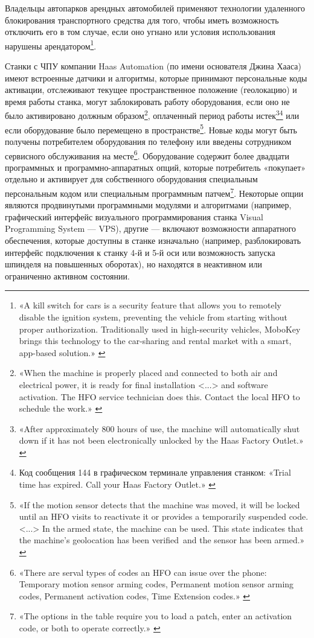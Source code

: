 \documentclass{article}
\begin{document}
Владельцы автопарков арендных автомобилей применяют технологии удаленного блокирования транспортного средства для того, чтобы иметь возможность отключить его в том случае, если оно угнано или условия использования нарушены арендатором\footnote{«A kill switch for cars is a security feature that allows you to remotely disable the ignition system, preventing the vehicle from starting without proper authorization. Traditionally used in high-security vehicles, MoboKey brings this technology to the car-sharing and rental market with a smart, app-based solution.» \cite{mobokeyCarRental2025}}.

Станки с ЧПУ компании Haas Automation (по имени основателя Джина Хааса) имеют встроенные датчики и алгоритмы, которые принимают персональные коды активации, отслеживают текущее пространственное положение (геолокацию) и время работы станка, могут заблокировать работу оборудования, если оно не было активировано должным образом\footnote{«When the machine is properly placed and connected to both air and electrical power, it is ready for final installation <...> and software activation. The HFO service technician does this. Contact the local HFO to schedule the work.» \cite{haascncLatheInstallation}}, оплаченный период работы истек\footnote{«After approximately 800 hours of use, the machine will automatically shut down if it has not been electronically unlocked by the Haas Factory Outlet.» \cite{haascncOperatorManual}}\footnote{Код сообщения 144 в графическом терминале управления станком: «Trial time has expired. Call your Haas Factory Outlet.» \cite{haascncAlarm144TrialExpired}} или если оборудование было перемещено в пространстве\footnote{«If the motion sensor detects that the machine was moved, it will be locked until an HFO visits to reactivate it or provides a temporarily suspended code. <...> In the armed state, the machine can be used. This state indicates that the machine's geolocation has been verified and the sensor has been armed.» \cite{haascncMotionSensor}}. Новые коды могут быть получены потребителем оборудования по телефону или введены сотрудником сервисного обслуживания на месте\footnote{«There are serval types of codes an HFO can issue over the phone: Temporary motion sensor arming codes, Permanent motion sensor arming codes, Permanent activation codes, Time Extension codes.» \cite{haascncArmMotionSensor}}. Оборудование содержит более двадцати программных и программно-аппаратных опций, которые потребитель «покупает» отдельно и активирует для собственного оборудования специальным персональным кодом или специальным программным патчем\footnote{«The options in the table require you to load a patch, enter an activation code, or both to operate correctly.» \cite{haascncActivationCodePatchNGC}}. Некоторые опции являются продвинутыми программными модулями и алгоритмами (например, графический интерфейс визуального программирования станка Visual Programming System — VPS), другие — включают возможности аппаратного обеспечения, которые доступны в станке изначально (например, разблокировать интерфейс подключения к станку 4-й и 5-й оси или возможность запуска шпинделя на повышенных оборотах), но находятся в неактивном или ограниченно активном состоянии.
\end{document}
